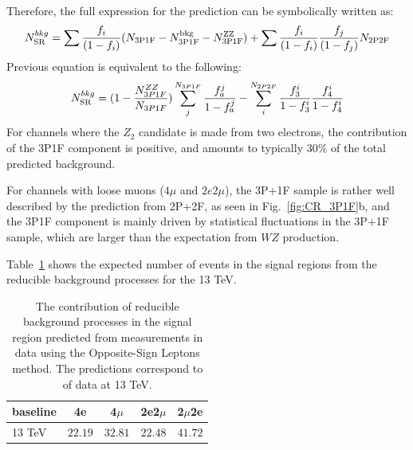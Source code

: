 Therefore, the
full expression for the prediction can be symbolically written as:
%
\begin{equation} 
\label{eq:PredictionSR}
N^{bkg}_{\rm SR} = \sum \frac{f_{i}}{(1-f_{i})} (N_{\rm 3P1F} - N^{\rm
bkg}_{\rm 3P1F} - N^{\rm ZZ}_{\rm 3P1F})
+ \sum \frac{f_{i}}{(1-f_{i})} \frac{f_{j}}{(1-f_{j})}N_{\rm 2P2F} \end{equation}
Previous equation is equivalent to the following:
\begin{equation}
\label{eq:PredictionSR2}
N^{bkg}_{\rm SR}= (1-\frac{N_{3P1F}^{ZZ}}{N_{3P1F}})\sum_j^{N_{3P1F}}\frac{f_a^j}{1-f_a^j} - \sum_i^{N_{2P2F}}\frac{f_3^i}{1-f_3^i}\frac{f_4^i}{1-f_4^i}
\end{equation}
For channels where the $Z_2$ candidate is made from two electrons, 
the contribution of the 3P1F component is 
positive, and amounts to typically $30 \%$ of the total predicted background.

For channels with loose muons ($4\mu$ and $2e2\mu$), the 3P+1F sample is rather well described by
the prediction from 2P+2F, as seen in Fig.~\ref{fig:CR_3P1F}b, and the
3P1F component is mainly driven by statistical fluctuations in the 3P+1F sample,
which are larger than the expectation from $WZ$ production.


Table~\ref{tab:reducibleMethodA} shows the expected number of
events in the signal regions from the reducible background processes for the 13 TeV. 

\begin{table}[h]
\begin{center}
     \begin{tabular}{| l | c | c | c | c |} \hline
 baseline	& 4e 	 & 4$\mu$ & 2e2$\mu$  & 2$\mu$2e   \\ \hline \hline
 13 TeV		& $22.19$ & $32.81$ & $22.48$    & $41.72$  \\  \hline
 	\end{tabular}
\end{center}
    \caption{ The contribution of reducible background
    processes in the signal region predicted from measurements in data
    using the Opposite-Sign Leptons method. The predictions correspond to \usedLumi of data at 13 TeV.}
     \label{tab:reducibleMethodA}
\end{table}


